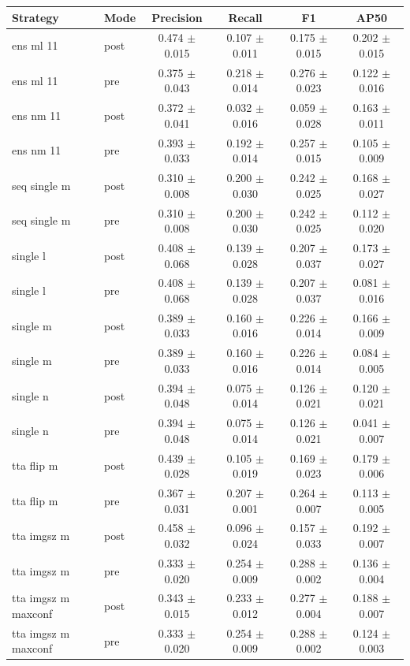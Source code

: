 \begin{tabular}{llcccc}
\toprule
Strategy & Mode & Precision & Recall & F1 & AP50 \\
\midrule
ens ml 11 & post & 0.474 $\pm$ 0.015 & 0.107 $\pm$ 0.011 & 0.175 $\pm$ 0.015 & 0.202 $\pm$ 0.015 \\
ens ml 11 & pre & 0.375 $\pm$ 0.043 & 0.218 $\pm$ 0.014 & 0.276 $\pm$ 0.023 & 0.122 $\pm$ 0.016 \\
ens nm 11 & post & 0.372 $\pm$ 0.041 & 0.032 $\pm$ 0.016 & 0.059 $\pm$ 0.028 & 0.163 $\pm$ 0.011 \\
ens nm 11 & pre & 0.393 $\pm$ 0.033 & 0.192 $\pm$ 0.014 & 0.257 $\pm$ 0.015 & 0.105 $\pm$ 0.009 \\
seq single m & post & 0.310 $\pm$ 0.008 & 0.200 $\pm$ 0.030 & 0.242 $\pm$ 0.025 & 0.168 $\pm$ 0.027 \\
seq single m & pre & 0.310 $\pm$ 0.008 & 0.200 $\pm$ 0.030 & 0.242 $\pm$ 0.025 & 0.112 $\pm$ 0.020 \\
single l & post & 0.408 $\pm$ 0.068 & 0.139 $\pm$ 0.028 & 0.207 $\pm$ 0.037 & 0.173 $\pm$ 0.027 \\
single l & pre & 0.408 $\pm$ 0.068 & 0.139 $\pm$ 0.028 & 0.207 $\pm$ 0.037 & 0.081 $\pm$ 0.016 \\
single m & post & 0.389 $\pm$ 0.033 & 0.160 $\pm$ 0.016 & 0.226 $\pm$ 0.014 & 0.166 $\pm$ 0.009 \\
single m & pre & 0.389 $\pm$ 0.033 & 0.160 $\pm$ 0.016 & 0.226 $\pm$ 0.014 & 0.084 $\pm$ 0.005 \\
single n & post & 0.394 $\pm$ 0.048 & 0.075 $\pm$ 0.014 & 0.126 $\pm$ 0.021 & 0.120 $\pm$ 0.021 \\
single n & pre & 0.394 $\pm$ 0.048 & 0.075 $\pm$ 0.014 & 0.126 $\pm$ 0.021 & 0.041 $\pm$ 0.007 \\
tta flip m & post & 0.439 $\pm$ 0.028 & 0.105 $\pm$ 0.019 & 0.169 $\pm$ 0.023 & 0.179 $\pm$ 0.006 \\
tta flip m & pre & 0.367 $\pm$ 0.031 & 0.207 $\pm$ 0.001 & 0.264 $\pm$ 0.007 & 0.113 $\pm$ 0.005 \\
tta imgsz m & post & 0.458 $\pm$ 0.032 & 0.096 $\pm$ 0.024 & 0.157 $\pm$ 0.033 & 0.192 $\pm$ 0.007 \\
tta imgsz m & pre & 0.333 $\pm$ 0.020 & 0.254 $\pm$ 0.009 & 0.288 $\pm$ 0.002 & 0.136 $\pm$ 0.004 \\
tta imgsz m maxconf & post & 0.343 $\pm$ 0.015 & 0.233 $\pm$ 0.012 & 0.277 $\pm$ 0.004 & 0.188 $\pm$ 0.007 \\
tta imgsz m maxconf & pre & 0.333 $\pm$ 0.020 & 0.254 $\pm$ 0.009 & 0.288 $\pm$ 0.002 & 0.124 $\pm$ 0.003 \\

\end{tabular}
